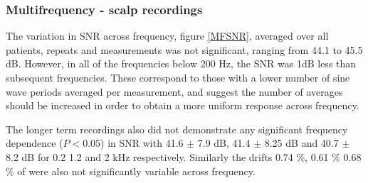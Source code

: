 \subsubsection{Multifrequency - scalp recordings}

The variation in SNR across frequency, figure \ref{MFSNR}, averaged over all patients, repeats and measurements was not significant, ranging from 44.1 to 45.5 dB.  However, in all of the frequencies below 200 Hz, the SNR was 1dB less than subsequent frequencies. These correspond to those with a lower number of sine wave periods averaged per measurement, and suggest the number of averages should be increased in order to obtain a more uniform response across frequency. 

The longer term recordings also did not demonstrate any significant frequency dependence ($P<0.05$) in SNR with 41.6 $\pm$ 7.9 dB, 41.4 $\pm$ 8.25 dB and 40.7 $\pm$ 8.2 dB for 0.2 1.2 and 2 kHz respectively. Similarly the drifts 0.74 \%, 0.61 \% 0.68 \% of were also not significantly variable across frequency.